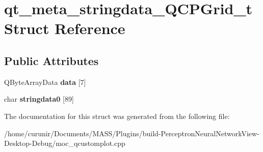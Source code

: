 \hypertarget{structqt__meta__stringdata___q_c_p_grid__t}{}\section{qt\+\_\+meta\+\_\+stringdata\+\_\+\+Q\+C\+P\+Grid\+\_\+t Struct Reference}
\label{structqt__meta__stringdata___q_c_p_grid__t}
\subsection*{Public Attributes}
\begin{DoxyCompactItemize}
\item 
Q\+Byte\+Array\+Data {\bfseries data} \mbox{[}7\mbox{]}\hypertarget{structqt__meta__stringdata___q_c_p_grid__t_ad7520be1ee34a662890da1cb1384cf28}{}\label{structqt__meta__stringdata___q_c_p_grid__t_ad7520be1ee34a662890da1cb1384cf28}

\item 
char {\bfseries stringdata0} \mbox{[}89\mbox{]}\hypertarget{structqt__meta__stringdata___q_c_p_grid__t_a125926539385574413c9ff82323a34ca}{}\label{structqt__meta__stringdata___q_c_p_grid__t_a125926539385574413c9ff82323a34ca}

\end{DoxyCompactItemize}


The documentation for this struct was generated from the following file\+:\begin{DoxyCompactItemize}
\item 
/home/curunir/\+Documents/\+M\+A\+S\+S/\+Plugins/build-\/\+Perceptron\+Neural\+Network\+View-\/\+Desktop-\/\+Debug/moc\+\_\+qcustomplot.\+cpp\end{DoxyCompactItemize}
